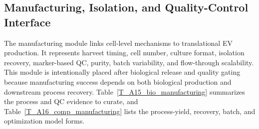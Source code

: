 \documentclass[Afour,sagev,times]{sagej}
\begin{document}
\subsection*{Manufacturing, Isolation, and Quality-Control Interface}

The manufacturing module links cell-level mechanisms to translational EV production. It represents harvest timing, cell number, culture format, isolation recovery, marker-based QC, purity, batch variability, and flow-through scalability. This module is intentionally placed after biological release and quality gating because manufacturing success depends on both biological production and downstream process recovery. Table~\ref{T_A15_bio_manufacturing} summarizes the process and QC evidence to curate, and Table~\ref{T_A16_comp_manufacturing} lists the process-yield, recovery, batch, and optimization model forms.
\end{document}
